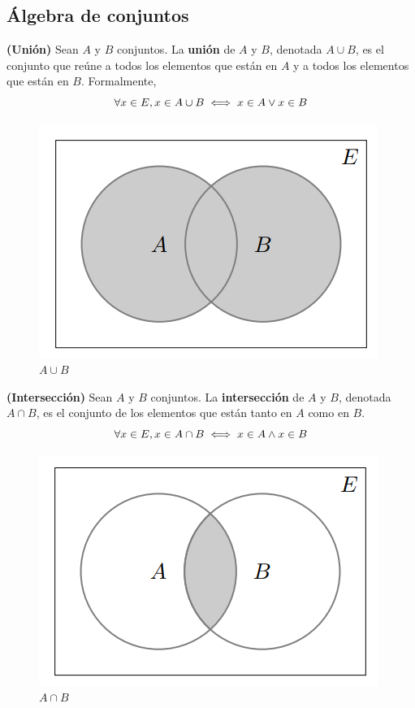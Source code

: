 \subsection{Álgebra de conjuntos}

\begin{definicion}
	\textbf{(Unión)}
	Sean $A$ y $B$ conjuntos. La \textbf{unión} de $A$ y $B$, denotada $A\cup B$, es el conjunto que reúne a todos los elementos que están en $A$ y a todos los elementos que están en $B$. Formalmente, 
	$$ \forall x \in E, x \in A \cup B \iff x \in A \vee x \in B $$ 
\end{definicion}


\begin{figure}[H]
	\begin{center}
		\includegraphics[scale=0.8]{figuras/capitulo1/02-conjuntos/union.png}
		\caption{$A \cup B$}
	\end{center}
\end{figure}

\begin{definicion}
	\textbf{(Intersección)}
	Sean $A$ y $B$ conjuntos. La \textbf{intersección} de $A$ y $B$, denotada $A\cap B$, es el conjunto de los elementos que están tanto en $A$ como en $B$. 
	$$ \forall x \in E, x \in A \cap B \iff x \in A \wedge x \in B $$ 
\end{definicion}

\begin{figure}[H]
	\begin{center}
		\includegraphics[scale=0.8]{figuras/capitulo1/02-conjuntos/interseccion.png}
		\caption{$A \cap  B$}
	\end{center}
\end{figure}

